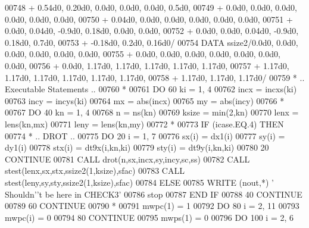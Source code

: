 \begin{DoxyCode}
00748      +                  0.54d0, 0.20d0, 0.0d0, 0.0d0, 0.0d0, 0.5d0,
00749      +                  0.0d0, 0.0d0, 0.0d0, 0.0d0, 0.0d0, 0.0d0,
00750      +                  0.04d0, 0.0d0, 0.0d0, 0.0d0, 0.0d0, 0.0d0,
00751      +                  0.0d0, 0.04d0, -0.9d0, 0.18d0, 0.0d0, 0.0d0,
00752      +                  0.0d0, 0.0d0, 0.04d0, -0.9d0, 0.18d0, 0.7d0,
00753      +                  -0.18d0, 0.2d0, 0.16d0/
00754       \textcolor{keyword}{DATA}              ssize2/0.0d0, 0.0d0, 0.0d0, 0.0d0, 0.0d0, 0.0d0,
00755      +                  0.0d0, 0.0d0, 0.0d0, 0.0d0, 0.0d0, 0.0d0, 0.0d0,
00756      +                  0.0d0, 1.17d0, 1.17d0, 1.17d0, 1.17d0, 1.17d0,
00757      +                  1.17d0, 1.17d0, 1.17d0, 1.17d0, 1.17d0, 1.17d0,
00758      +                  1.17d0, 1.17d0, 1.17d0/
00759 \textcolor{comment}{*     .. Executable Statements ..}
00760 \textcolor{comment}{*}
00761       \textcolor{keywordflow}{DO} 60 ki = 1, 4
00762          incx = incxs(ki)
00763          incy = incys(ki)
00764          mx = abs(incx)
00765          my = abs(incy)
00766 \textcolor{comment}{*}
00767          \textcolor{keywordflow}{DO} 40 kn = 1, 4
00768             n = ns(kn)
00769             ksize = min(2,kn)
00770             lenx = lens(kn,mx)
00771             leny = lens(kn,my)
00772 \textcolor{comment}{*}
00773             \textcolor{keywordflow}{IF} (icase.EQ.4) \textcolor{keywordflow}{THEN}
00774 \textcolor{comment}{*              .. DROT ..}
00775                \textcolor{keywordflow}{DO} 20 i = 1, 7
00776                   sx(i) = dx1(i)
00777                   sy(i) = dy1(i)
00778                   stx(i) = dt9x(i,kn,ki)
00779                   sty(i) = dt9y(i,kn,ki)
00780    20          \textcolor{keywordflow}{CONTINUE}
00781                \textcolor{keyword}{CALL }drot(n,sx,incx,sy,incy,sc,ss)
00782                \textcolor{keyword}{CALL }stest(lenx,sx,stx,ssize2(1,ksize),sfac)
00783                \textcolor{keyword}{CALL }stest(leny,sy,sty,ssize2(1,ksize),sfac)
00784             \textcolor{keywordflow}{ELSE}
00785                \textcolor{keyword}{WRITE} (nout,*) \textcolor{stringliteral}{' Shouldn'}\textcolor{stringliteral}{'t be here in CHECK3'}
00786                stop
00787 \textcolor{keywordflow}{            END IF}
00788    40    \textcolor{keywordflow}{CONTINUE}
00789    60 \textcolor{keywordflow}{CONTINUE}
00790 \textcolor{comment}{*}
00791       mwpc(1) = 1
00792       \textcolor{keywordflow}{DO} 80 i = 2, 11
00793          mwpc(i) = 0
00794    80 \textcolor{keywordflow}{CONTINUE}
00795       mwps(1) = 0
00796       \textcolor{keywordflow}{DO} 100 i = 2, 6

\end{DoxyCode}
